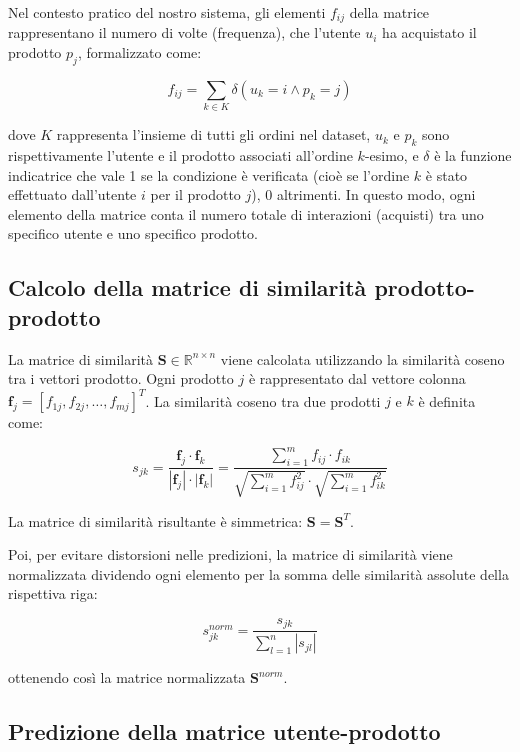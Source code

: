 Nel contesto pratico del nostro sistema, gli elementi $f_{ij}$ della matrice rappresentano il numero di volte (frequenza), che l'utente $u_i$ ha acquistato il prodotto $p_j$, formalizzato come:

\begin{equation}
f_{ij} = \sum_{k \in K} \delta(u_k = i \land p_k = j)
\end{equation}

dove $K$ rappresenta l'insieme di tutti gli ordini nel dataset, $u_k$ e $p_k$ sono rispettivamente l'utente e il prodotto associati all'ordine $k$-esimo, e $\delta$ è la funzione indicatrice che vale 1 se la condizione è verificata (cioè se l'ordine $k$ è stato effettuato dall'utente $i$ per il prodotto $j$), 0 altrimenti. In questo modo, ogni elemento della matrice conta il numero totale di interazioni (acquisti) tra uno specifico utente e uno specifico prodotto.

\subsection{Calcolo della matrice di similarità prodotto-prodotto}

La matrice di similarità $\mathbf{S} \in \mathbb{R}^{n \times n}$ viene calcolata utilizzando la similarità coseno tra i vettori prodotto. Ogni prodotto $j$ è rappresentato dal vettore colonna $\mathbf{f}_j = [f_{1j}, f_{2j}, \ldots, f_{mj}]^T$. La similarità coseno tra due prodotti $j$ e $k$ è definita come:

\begin{equation}
s_{jk} = \frac{\mathbf{f}_j \cdot \mathbf{f}_k}{|\mathbf{f}_j| \cdot |\mathbf{f}_k|} = \frac{\sum_{i=1}^{m} f_{ij} \cdot f_{ik}}{\sqrt{\sum_{i=1}^{m} f_{ij}^2} \cdot \sqrt{\sum_{i=1}^{m} f_{ik}^2}}
\end{equation}

La matrice di similarità risultante è simmetrica: $\mathbf{S} = \mathbf{S}^T$.

Poi, per evitare distorsioni nelle predizioni, la matrice di similarità viene normalizzata dividendo ogni elemento per la somma delle similarità assolute della rispettiva riga:

\begin{equation}
s_{jk}^{norm} = \frac{s_{jk}}{\sum_{l=1}^{n} |s_{jl}|}
\end{equation}

ottenendo così la matrice normalizzata $\mathbf{S}^{norm}$.

\subsection{Predizione della matrice utente-prodotto}

